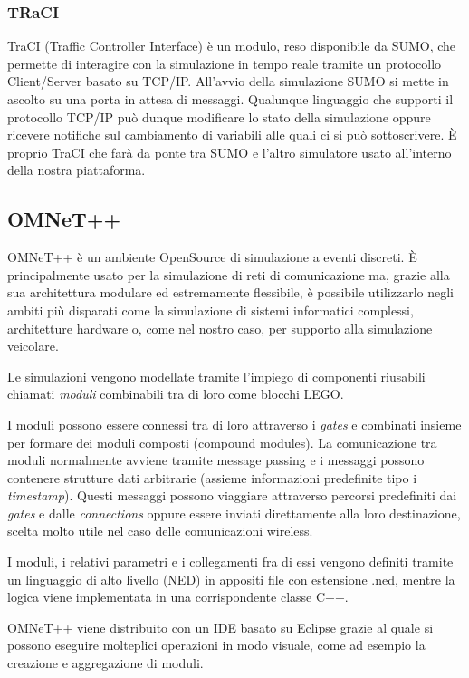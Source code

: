 \subsubsection{TRaCI}

TraCI (Traffic Controller Interface) è un modulo, reso disponibile da SUMO, che permette di interagire con la simulazione in tempo reale tramite un protocollo Client/Server basato su TCP/IP. All'avvio della simulazione SUMO si mette in ascolto su una porta in attesa di messaggi. Qualunque linguaggio che supporti il protocollo TCP/IP può dunque modificare lo stato della simulazione oppure ricevere notifiche sul cambiamento di variabili alle quali ci si può sottoscrivere. È proprio TraCI che farà da ponte tra SUMO e l'altro simulatore usato all'interno della nostra piattaforma.

\subsection{OMNeT++}

OMNeT++ è un ambiente OpenSource di simulazione a eventi discreti. È principalmente usato per la simulazione di reti di comunicazione ma, grazie alla sua architettura modulare ed estremamente flessibile, è possibile utilizzarlo negli ambiti più disparati come la simulazione di sistemi informatici complessi, architetture hardware o, come nel nostro caso, per supporto alla simulazione veicolare.

Le simulazioni vengono modellate tramite l'impiego di componenti riusabili chiamati \emph{moduli} combinabili tra di loro come blocchi LEGO.

I moduli possono essere connessi tra di loro attraverso i \emph{gates} e combinati insieme per formare dei moduli composti (compound modules). La comunicazione tra moduli normalmente avviene tramite message passing e i messaggi possono contenere strutture dati arbitrarie (assieme informazioni predefinite tipo i \emph{timestamp}). Questi messaggi possono viaggiare attraverso percorsi predefiniti dai \emph{gates} e dalle \emph{connections} oppure essere inviati direttamente alla loro destinazione, scelta molto utile nel caso delle comunicazioni wireless. 

I moduli, i relativi parametri e i collegamenti fra di essi vengono definiti tramite un linguaggio di alto livello (NED) in appositi file con estensione .ned, mentre la logica viene implementata in una corrispondente classe C++.

OMNeT++ viene distribuito con un IDE basato su Eclipse grazie al quale si possono eseguire molteplici operazioni in modo visuale, come ad esempio la creazione e aggregazione di moduli.

